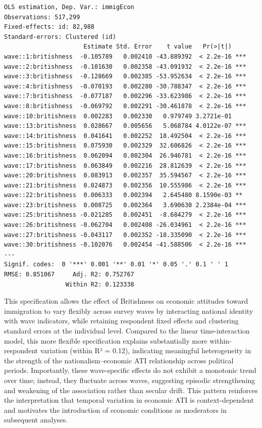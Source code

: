 \documentclass[
  11pt,
  letterpaper,
  DIV=11,
  numbers=noendperiod]{scrartcl}
\begin{document}
\begin{verbatim}
OLS estimation, Dep. Var.: immigEcon
Observations: 517,299
Fixed-effects: id: 82,988
Standard-errors: Clustered (id) 
                      Estimate Std. Error    t value   Pr(>|t|)    
wave::1:britishness  -0.105789   0.002410 -43.889392  < 2.2e-16 ***
wave::2:britishness  -0.101630   0.002358 -43.091932  < 2.2e-16 ***
wave::3:britishness  -0.128669   0.002385 -53.952634  < 2.2e-16 ***
wave::4:britishness  -0.070193   0.002280 -30.788347  < 2.2e-16 ***
wave::7:britishness  -0.077187   0.002296 -33.623986  < 2.2e-16 ***
wave::8:britishness  -0.069792   0.002291 -30.461878  < 2.2e-16 ***
wave::10:britishness  0.002283   0.002330   0.979749 3.2721e-01    
wave::13:britishness  0.028667   0.005656   5.068784 4.0122e-07 ***
wave::14:britishness  0.041641   0.002252  18.492504  < 2.2e-16 ***
wave::15:britishness  0.075930   0.002329  32.606826  < 2.2e-16 ***
wave::16:britishness  0.062094   0.002304  26.946781  < 2.2e-16 ***
wave::17:britishness  0.063849   0.002216  28.812639  < 2.2e-16 ***
wave::20:britishness  0.083913   0.002357  35.594567  < 2.2e-16 ***
wave::21:britishness  0.024873   0.002356  10.555986  < 2.2e-16 ***
wave::22:britishness  0.006333   0.002394   2.645480 8.1590e-03 ** 
wave::23:britishness  0.008725   0.002364   3.690630 2.2384e-04 ***
wave::25:britishness -0.021285   0.002451  -8.684279  < 2.2e-16 ***
wave::26:britishness -0.062704   0.002408 -26.034961  < 2.2e-16 ***
wave::27:britishness -0.043117   0.002352 -18.335090  < 2.2e-16 ***
wave::30:britishness -0.102076   0.002454 -41.588506  < 2.2e-16 ***
---
Signif. codes:  0 '***' 0.001 '**' 0.01 '*' 0.05 '.' 0.1 ' ' 1
RMSE: 0.851067     Adj. R2: 0.752767
                 Within R2: 0.123338
\end{verbatim}

This specification allows the effect of Britishness on economic
attitudes toward immigration to vary flexibly across survey waves by
interacting national identity with wave indicators, while retaining
respondent fixed effects and clustering standard errors at the
individual level. Compared to the linear time-interaction model, this
more flexible specification explains substantially more
within-respondent variation (within R² = 0.12), indicating meaningful
heterogeneity in the strength of the nationalism--economic ATI
relationship across political periods. Importantly, these wave-specific
effects do not exhibit a monotonic trend over time; instead, they
fluctuate across waves, suggesting episodic strengthening and weakening
of the association rather than secular drift. This pattern reinforces
the interpretation that temporal variation in economic ATI is
context-dependent and motivates the introduction of economic conditions
as moderators in subsequent analyses.
\end{document}
